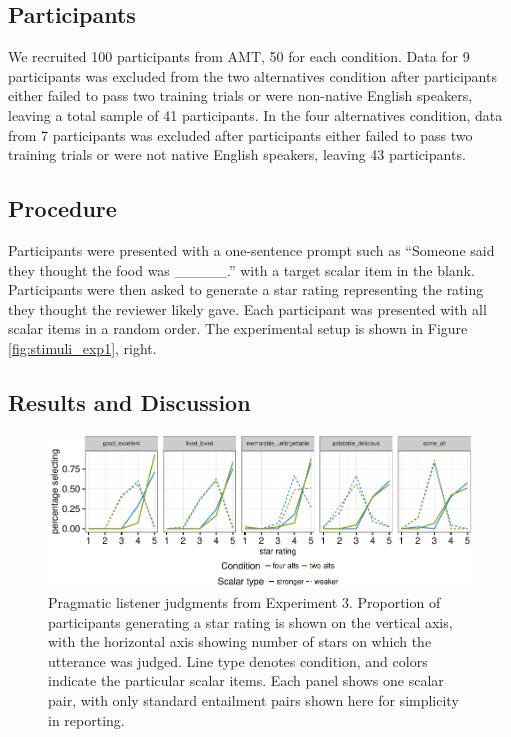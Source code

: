 \documentclass[10pt, letterpaper]{article}
\newenvironment{CodeChunk}{}{}
\begin{document}
\subsection{Participants}\label{participants-2}

We recruited 100 participants from AMT, 50 for each condition. Data for
9 participants was excluded from the two alternatives condition after
participants either failed to pass two training trials or were
non-native English speakers, leaving a total sample of 41 participants.
In the four alternatives condition, data from 7 participants was
excluded after participants either failed to pass two training trials or
were not native English speakers, leaving 43 participants.

\subsection{Procedure}\label{procedure}

Participants were presented with a one-sentence prompt such as ``Someone
said they thought the food was \_\_\_\_\_.'' with a target scalar item
in the blank. Participants were then asked to generate a star rating
representing the rating they thought the reviewer likely gave. Each
participant was presented with all scalar items in a random order. The
experimental setup is shown in Figure \ref{fig:stimuli_exp1}, right.

\subsection{Results and Discussion}\label{results-and-discussion-2}

\begin{CodeChunk}
\begin{figure}[t]

{\centering \includegraphics{figs/exp2Plots-1} 

}

\caption[Pragmatic listener judgments from Experiment 3]{Pragmatic listener judgments from Experiment 3. Proportion of participants generating a star rating is shown on the vertical axis, with the horizontal axis showing number of stars on which the utterance was judged. Line type denotes condition, and colors indicate the particular scalar items. Each panel shows one scalar pair, with only standard entailment pairs shown here for simplicity in reporting.}\label{fig:exp2Plots}
\end{figure}
\end{CodeChunk}
\end{document}
